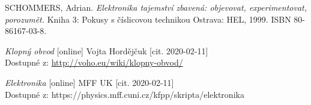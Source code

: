  \newpage

 \label{liter}
 \begin{thebibliography}{99}

 SCHOMMERS, Adrian. \textit{Elektronika tajemství zbavená: objevovat, experimentovat, porozumět.} 
Kniha 3: Pokusy s číslicovou technikou
Ostrava: HEL, 1999. ISBN 80-86167-03-8.

\textit{Klopný obvod} [online] Vojta Hordějčuk [cit. 2020-02-11] \\
Dostupné z: \url{http://voho.eu/wiki/klopny-obvod/}

 \textit{Elektronika} [online] MFF UK [cit. 2020-02-11] \\
Dostupné z: https://physics.mff.cuni.cz/kfpp/skripta/elektronika



\end{thebibliography}
